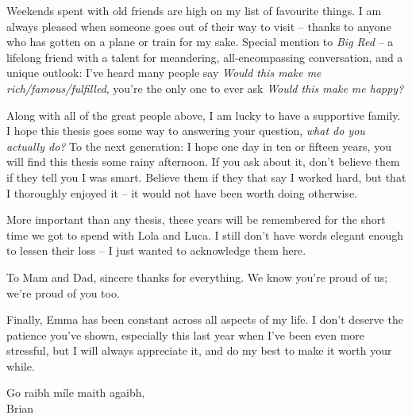 \par 

Weekends spent with old friends are high on my list of favourite things. 
I am always pleased when someone goes out of their way to visit -- 
    thanks to anyone who has gotten on a plane or train for my sake. 
Special mention to \emph{Big Red} -- a lifelong friend with a talent for 
    meandering, all-encompassing conversation, and a unique outlook:
    I've heard many people say \emph{Would this make me rich/famous/fulfilled}, 
    you're the only one to ever ask \emph{Would this make me happy?}
\par 

Along with all of the great people above, 
    I am lucky to have a supportive family. 
I hope this thesis goes some way to answering your question, 
    \emph{what do you actually do?} 
To the next generation: 
    I hope one day in ten or fifteen years, you will find this thesis some rainy afternoon. 
If you ask about it, don't believe them if they tell you I was smart. 
Believe them if they that say I worked hard, but that I thoroughly enjoyed it -- it would not have been worth doing otherwise. 
\par 
More important than any thesis, these years will be remembered for 
    the short time we got to spend with Lola and Luca. 
I still don't have words elegant enough to lessen their loss -- I just wanted to acknowledge them here. 
\par 

To Mam and Dad, sincere thanks for everything. 
We know you're proud of us; 
    we're proud of you too. 
\par 
Finally, Emma has been constant across all aspects of my life.
I don't deserve the patience you've shown, especially this last year when I've been even more stressful, 
    but I will always appreciate it, and do my best to make it worth your while.  

\begin{flushright}
    Go raibh m\'ile maith agaibh, \\
    Brian
\end{flushright}